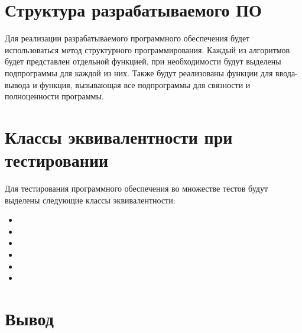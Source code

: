\section{Структура разрабатываемого ПО}

Для реализации разрабатываемого программного обеспечения будет использоваться
метод структурного программирования. Каждый из алгоритмов будет представлен
отдельной функцией, при необходимости будут выделены подпрограммы для каждой из
них. Также будут реализованы функции для ввода-вывода и функция, вызывающая все
подпрограммы для связности и полноценности программы.

\section{Классы эквивалентности при тестировании}

Для тестирования программного обеспечения во множестве тестов будут выделены
следующие классы эквивалентности:
\begin{itemize}[left=\parindent]
    \item
    \item
    \item
    \item
    \item
    \item
\end{itemize}

\section{Вывод}
